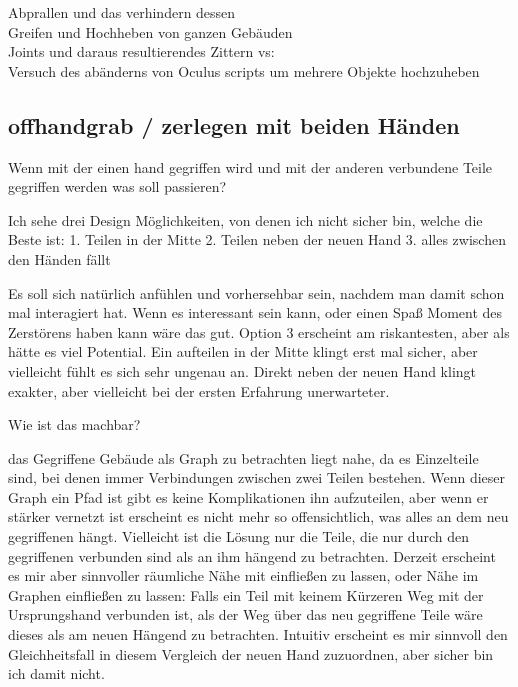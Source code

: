 \documentclass[11pt]{article} %
\begin{document}
Abprallen und das verhindern dessen\\

Greifen und Hochheben von ganzen Gebäuden \\

Joints und daraus resultierendes Zittern vs: \\

Versuch des abänderns von Oculus scripts um mehrere Objekte hochzuheben 

\subsection{offhandgrab / zerlegen mit beiden Händen}

Wenn mit der einen hand gegriffen wird und mit der anderen verbundene Teile gegriffen werden was soll passieren?

Ich sehe drei Design Möglichkeiten, von denen ich nicht sicher bin, welche die Beste ist:
1. Teilen in der Mitte
2. Teilen neben der neuen Hand
3. alles zwischen den Händen fällt

Es soll sich natürlich anfühlen und vorhersehbar sein, nachdem man damit schon mal interagiert hat.
Wenn es interessant sein kann, oder einen Spaß Moment des Zerstörens haben kann wäre das gut.
Option 3 erscheint am riskantesten, aber als hätte es viel Potential. 
Ein aufteilen in der Mitte klingt erst mal sicher, aber vielleicht fühlt es sich sehr ungenau an.
Direkt neben der neuen Hand klingt exakter, aber vielleicht bei der ersten Erfahrung unerwarteter.

Wie ist das machbar?

das Gegriffene Gebäude als Graph zu betrachten liegt nahe, da es Einzelteile sind, bei denen immer Verbindungen zwischen zwei Teilen bestehen.
Wenn dieser Graph ein Pfad ist gibt es keine Komplikationen ihn aufzuteilen, aber wenn er stärker vernetzt ist erscheint es nicht mehr so offensichtlich, was alles an dem neu gegriffenen hängt.
Vielleicht ist die Lösung nur die Teile, die nur durch den gegriffenen verbunden sind als an ihm hängend zu betrachten.
Derzeit erscheint es mir aber sinnvoller räumliche Nähe mit einfließen zu lassen, oder Nähe im Graphen einfließen zu lassen: Falls ein Teil mit keinem Kürzeren Weg mit der Ursprungshand verbunden ist, als der Weg über das neu gegriffene Teile wäre dieses als am neuen Hängend zu betrachten.
Intuitiv erscheint es mir sinnvoll den Gleichheitsfall in diesem Vergleich der neuen Hand zuzuordnen, aber sicher bin ich damit nicht.
\end{document}
